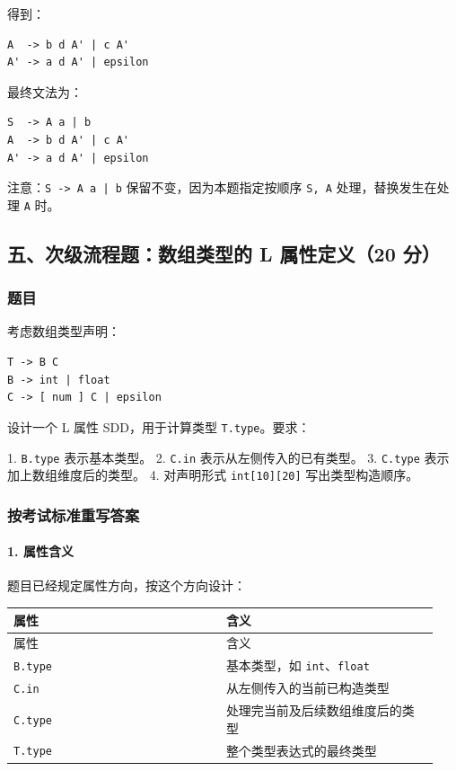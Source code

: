 \documentclass[UTF8]{ctexart}
\begin{document}
得到：

\begin{Verbatim}[fontsize=\small,breaklines=true]
A  -> b d A' | c A'
A' -> a d A' | epsilon
\end{Verbatim}

最终文法为：

\begin{Verbatim}[fontsize=\small,breaklines=true]
S  -> A a | b
A  -> b d A' | c A'
A' -> a d A' | epsilon
\end{Verbatim}

注意：\texttt{S -> A a | b} 保留不变，因为本题指定按顺序 \texttt{S, A} 处理，替换发生在处理 \texttt{A} 时。

\subsection*{五、次级流程题：数组类型的 L 属性定义（20 分）}

\subsubsection*{题目}

考虑数组类型声明：

\begin{Verbatim}[fontsize=\small,breaklines=true]
T -> B C
B -> int | float
C -> [ num ] C | epsilon
\end{Verbatim}

设计一个 L 属性 SDD，用于计算类型 \texttt{T.type}。要求：

1. \texttt{B.type} 表示基本类型。 2. \texttt{C.in} 表示从左侧传入的已有类型。 3. \texttt{C.type} 表示加上数组维度后的类型。 4. 对声明形式 \texttt{int[10][20]} 写出类型构造顺序。

\subsubsection*{按考试标准重写答案}

\paragraph*{1. 属性含义}

题目已经规定属性方向，按这个方向设计：

\begin{longtable}{|p{0.47\linewidth}|p{0.47\linewidth}|}
\hline
属性 & 含义 \\
\hline
\endfirsthead
属性 & 含义 \\
\hline
\endhead
\texttt{B.type} & 基本类型，如 \texttt{int}、\texttt{float} \\
\hline
\texttt{C.in} & 从左侧传入的当前已构造类型 \\
\hline
\texttt{C.type} & 处理完当前及后续数组维度后的类型 \\
\hline
\texttt{T.type} & 整个类型表达式的最终类型 \\
\hline
\end{longtable}
\end{document}

